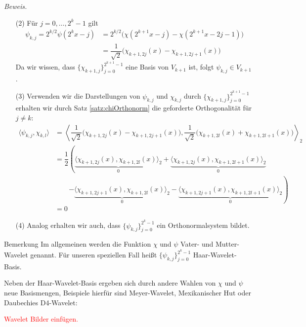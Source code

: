 \textit{Beweis.} 
\begin{enumerate}
  \item[(2)] 
  Für $j=0,\dots,2^k-1$ gilt 
  \begin{align*}
    \psi_{k,j} 
    = 2^{k/2}\psi(2^kx-j) 
    &= 2^{k/2}\Big(\chi(2^{k+1}x-j)-\chi(2^{k+1}x-2j-1)\Big) \\
    &= \dfrac{1}{\sqrt{2}}\Big(\chi_{k+1,2j}(x) - \chi_{k+1,2j+1}(x)\Big)
  \end{align*}
  Da wir wissen, dass $\{\chi_{k+1,j}\}_{j=0}^{2^{k+1}-1}$ eine Basis von $V_{k+1}$ ist, folgt $\psi_{k,j}\in V_{k+1}$.
  \item[(3)] Verwenden wir die Darstellungen von $\psi_{k,j}$ und $\chi_{k,j}$ durch $\{\chi_{k+1,j}\}_{j=0}^{2^{k+1}-1}$
  erhalten wir durch Satz \ref{satz:chiOrthonorm} die geforderte Orthogonalität für $j\neq k$:
  \begin{align*}
    \langle \psi_{k,j}, \chi_{k,l} \rangle
    &= \left\langle \dfrac{1}{\sqrt{2}}\Big(\chi_{k+1,2j}(x) - \chi_{k+1,2j+1}(x)\Big), 
    \dfrac{1}{\sqrt{2}}\Big(\chi_{k+1,2l}(x) + \chi_{k+1,2l+1}(x)\Big) \right\rangle _2 \\
    &= \dfrac{1}{2}\left(
      \underbrace{\langle \chi_{k+1,2j}(x), \chi_{k+1,2l}(x) \rangle_2}_{0}
      + \underbrace{\langle \chi_{k+1,2j}(x), \chi_{k+1,2l+1}(x) \rangle_2}_{0}\right.\\
      &\qquad \left.- \underbrace{\langle \chi_{k+1,2j+1}(x), \chi_{k+1,2l}(x) \rangle_2}_{0}
      - \underbrace{\langle \chi_{k+1,2j+1}(x), \chi_{k+1,2l+1}(x) \rangle_2}_{0} 
    \right)\\
    &= 0
  \end{align*}
  \item[(4)] Analog erhalten wir auch, dass $\{\psi_{k,j}\}_{j=0}^{2^k-1}$ ein Orthonormalsystem bildet.
\end{enumerate}

\begin{colbox}{Bemerkung}
  Im allgemeinen werden die Funktion $\chi$ und $\psi$ Vater- und Mutter-Wavelet genannt. Für unseren speziellen Fall 
  heißt $\{\psi_{k,j}\}_{j=0}^{2^k-1}$ Haar-Wavelet-Basis. 

  Neben der Haar-Wavelet-Basis ergeben sich durch andere Wahlen von $\chi$ und $\psi$ neue Basismengen, Beispiele 
  hierfür sind Meyer-Wavelet, Mexikanischer Hut oder Daubechies D4-Wavelet:

  \textcolor{red}{Wavelet Bilder einfügen.}
\end{colbox}

